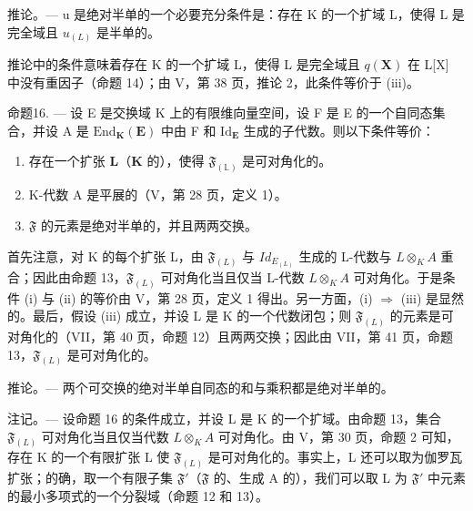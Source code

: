 推论。--- u 是绝对半单的一个必要充分条件是：存在 K 的一个扩域 L，使得 L 是完全域且 \(u_{(L)}\) 是半单的。

推论中的条件意味着存在 K 的一个扩域 L，使得 L 是完全域且 \(q(\mathbf{X})\) 在 L{[}X{]} 中没有重因子（命题 14）；由 V，第 38 页，推论 2，此条件等价于 (iii)。

命题16. --- 设 E 是交换域 K 上的有限维向量空间，设 F 是 E 的一个自同态集合，并设 A 是 \(\mathrm{End}_{\mathbf{K}}(\mathbf{E})\) 中由 F 和 \(\mathrm{Id}_{\mathbf{E}}\) 生成的子代数。则以下条件等价：

\begin{enumerate}
\def\labelenumi{(\roman{enumi})}
\item
  存在一个扩张 \(\mathbf{L}\)（\(\mathbf{K}\) 的），使得 \(\mathfrak{F}_{(\mathbb{L})}\) 是可对角化的。
\item
  K-代数 A 是平展的（V，第 28 页，定义 1）。
\item
  \(\mathfrak{F}\) 的元素是绝对半单的，并且两两交换。
\end{enumerate}

首先注意，对 K 的每个扩张 L，由 \(\mathfrak{F}_{(L)}\) 与 \(Id_{E_{(L)}}\) 生成的 L-代数与 \(L \otimes_{K} A\) 重合；因此由命题 13，\(\mathfrak{F}_{(L)}\) 可对角化当且仅当 L-代数 \(L \otimes_{K} A\) 可对角化。于是条件 (i) 与 (ii) 的等价由 V，第 28 页，定义 1 得出。另一方面，(i) \(\Rightarrow\) (iii) 是显然的。最后，假设 (iii) 成立，并设 L 是 K 的一个代数闭包；则 \(\mathfrak{F}_{(L)}\) 的元素是可对角化的（VII，第 40 页，命题 12）且两两交换；因此由 VII，第 41 页，命题 13，\(\mathfrak{F}_{(L)}\) 是可对角化的。

推论。--- 两个可交换的绝对半单自同态的和与乘积都是绝对半单的。

注记。--- 设命题 16 的条件成立，并设 L 是 K 的一个扩域。由命题 13，集合 \(\mathfrak{F}_{(L)}\) 可对角化当且仅当代数 \(L \otimes_K A\) 可对角化。由 V，第 30 页，命题 2 可知，存在 K 的一个有限扩张 L 使 \(\mathfrak{F}_{(L)}\) 是可对角化的。事实上，L 还可以取为伽罗瓦扩张；的确，取一个有限子集 \(\mathfrak{F}'\)（\(\mathfrak{F}\) 的、生成 A 的），我们可以取 L 为 \(\mathfrak{F}'\) 中元素的最小多项式的一个分裂域（命题 12 和 13）。


